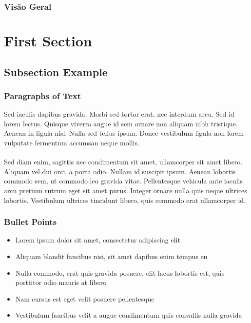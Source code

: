 \documentclass{beamer}
\title[\shortpapertitle]{\papertitle}
\author[Eduardo Tenório]{\authorname}
\institute[CIn-UFPE]
{
    \centername
    \\
    \universityname
    \\
    \papertype\space em \programname
    \\
    \medskip
    \textit{embat@cin.ufpe.br}
}
\date{\defensedate}
\begin{document}
\begin{frame}
\titlepage
\end{frame}

\begin{frame}
\frametitle{Visão Geral}
\tableofcontents
\end{frame}

\section{First Section}
\subsection{Subsection Example}

\begin{frame}
\frametitle{Paragraphs of Text}
Sed iaculis dapibus gravida. Morbi sed tortor erat, nec interdum arcu. Sed id lorem lectus. Quisque viverra augue id sem ornare non aliquam nibh tristique. Aenean in ligula nisl. Nulla sed tellus ipsum. Donec vestibulum ligula non lorem vulputate fermentum accumsan neque mollis.\\~\\

Sed diam enim, sagittis nec condimentum sit amet, ullamcorper sit amet libero. Aliquam vel dui orci, a porta odio. Nullam id suscipit ipsum. Aenean lobortis commodo sem, ut commodo leo gravida vitae. Pellentesque vehicula ante iaculis arcu pretium rutrum eget sit amet purus. Integer ornare nulla quis neque ultrices lobortis. Vestibulum ultrices tincidunt libero, quis commodo erat ullamcorper id.
\end{frame}

\begin{frame}
\frametitle{Bullet Points}
\begin{itemize}
\item Lorem ipsum dolor sit amet, consectetur adipiscing elit
\item Aliquam blandit faucibus nisi, sit amet dapibus enim tempus eu
\item Nulla commodo, erat quis gravida posuere, elit lacus lobortis est, quis porttitor odio mauris at libero
\item Nam cursus est eget velit posuere pellentesque
\item Vestibulum faucibus velit a augue condimentum quis convallis nulla gravida
\end{itemize}
\end{frame}
\end{document}
